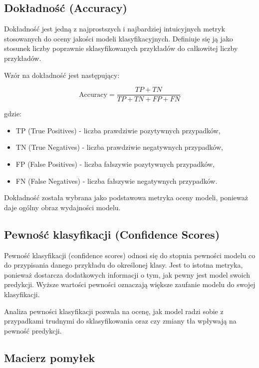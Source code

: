 \subsection*{Dokładność (Accuracy)}

Dokładność jest jedną z najprostszych i najbardziej intuicyjnych metryk stosowanych do oceny jakości modeli 
klasyfikacyjnych. Definiuje się ją jako stosunek liczby poprawnie sklasyfikowanych przykładów do całkowitej liczby 
przykładów.

Wzór na dokładność jest następujący:

\begin{equation}
\text{Accuracy} = \frac{TP + TN}{TP + TN + FP + FN}
\end{equation}

gdzie:
\begin{itemize}
    \item TP (True Positives) - liczba prawdziwie pozytywnych przypadków,
    \item TN (True Negatives) - liczba prawdziwie negatywnych przypadków,
    \item FP (False Positives) - liczba fałszywie pozytywnych przypadków,
    \item FN (False Negatives) - liczba fałszywie negatywnych przypadków.
\end{itemize}

Dokładność została wybrana jako podstawowa metryka oceny modeli, ponieważ daje ogólny obraz wydajności modelu.

\subsection*{Pewność klasyfikacji (Confidence Scores)}

Pewność klasyfikacji (confidence scores) odnosi się do stopnia pewności modelu co do przypisania danego przykładu do 
określonej klasy. Jest to istotna metryka, ponieważ dostarcza dodatkowych informacji o tym, jak pewny jest model swoich 
predykcji. Wyższe wartości pewności oznaczają większe zaufanie modelu do swojej klasyfikacji.

Analiza pewności klasyfikacji pozwala na ocenę, jak model radzi sobie z przypadkami trudnymi do sklasyfikowania oraz 
czy zmiany tła wpływają na pewność predykcji.

\subsection*{Macierz pomyłek}

